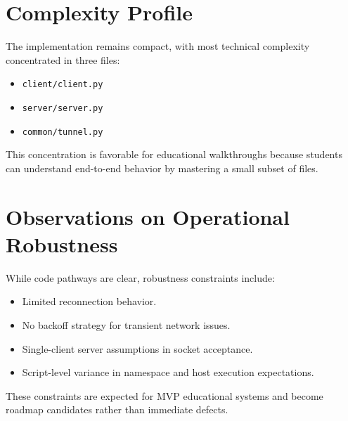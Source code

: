 \section{Complexity Profile}
The implementation remains compact, with most technical complexity concentrated in three files:
\begin{itemize}[leftmargin=2em]
\item \texttt{client/client.py}
\item \texttt{server/server.py}
\item \texttt{common/tunnel.py}
\end{itemize}

This concentration is favorable for educational walkthroughs because students can understand end-to-end behavior by mastering a small subset of files.

\section{Observations on Operational Robustness}
While code pathways are clear, robustness constraints include:
\begin{itemize}[leftmargin=2em]
\item Limited reconnection behavior.
\item No backoff strategy for transient network issues.
\item Single-client server assumptions in socket acceptance.
\item Script-level variance in namespace and host execution expectations.
\end{itemize}

These constraints are expected for MVP educational systems and become roadmap candidates rather than immediate defects.
